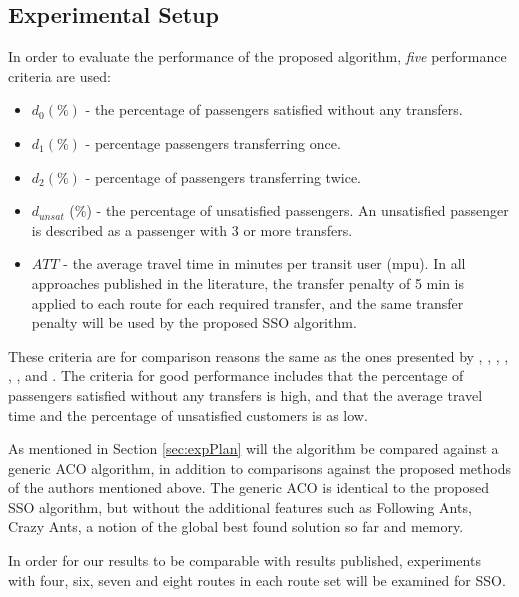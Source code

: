 \subsection{Experimental Setup}
\label{subsec:performanceComparison_setup}
In order to evaluate the performance of the proposed algorithm, \textit{five} performance criteria are used:
\begin{itemize}
\item $d_0 (\%)$ - the percentage of passengers satisfied without any transfers. 
\item $d_1 (\%)$ - percentage passengers transferring once. 
\item $d_2 (\%)$ - percentage of passengers transferring twice. 
\item $d_{unsat}$ (\%) - the percentage of unsatisfied passengers. An unsatisfied passenger is described as a passenger with 3 or more transfers. 
\item $ATT$  - the average travel time in minutes per transit user (mpu). In all approaches published in the literature, the transfer penalty of 5 min is applied to each route for each required transfer, and the same transfer penalty will be used by the proposed SSO algorithm.
\end{itemize}
These criteria are for comparison reasons the same as the ones presented by \citet{mandl79}, \citet{kechagiopoulos14}, \citet{kidwai98}, \citet{fan10}, \citet{chakroborty02}, \citet{zhang10}, and \citet{chew12}. The criteria for good performance includes that the percentage of passengers satisfied without any transfers is high, and that the average travel time and the percentage of unsatisfied customers is as low. 

As mentioned in Section \vref{sec:expPlan} will the algorithm be compared against a generic ACO algorithm, in addition to comparisons against the proposed methods of the authors mentioned above. The generic ACO is identical to the proposed SSO algorithm, but without the additional features such as Following Ants, Crazy Ants, a notion of the global best found solution so far and memory. 

In order for our results to be comparable with results published, experiments with four, six, seven and eight routes in each route set will be examined for SSO. 

